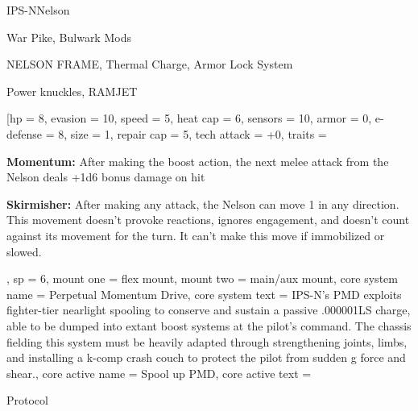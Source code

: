 
\begin{mech}{IPS-N}{Nelson}


\begin{license}
\item War Pike, Bulwark Mods
\item NELSON FRAME, Thermal Charge, Armor Lock System
\item Power knuckles, RAMJET
\end{license}

\frameBox
[hp = 8,
evasion = 10,
speed = 5,
heat cap = 6,
sensors = 10,
armor = 0,
e-defense = 8,
size = 1,
repair cap = 5,
tech attack = +0,
traits = {\textbf{Momentum:} After making the boost action, the next melee attack from the Nelson deals +1d6 bonus damage on hit

\textbf{Skirmisher:} After making any attack, the Nelson can move 1 in any direction. This movement doesn’t provoke reactions, ignores engagement, and doesn’t count against its movement for the turn. It can’t make this move if immobilized or slowed.},
sp = 6,
mount one = flex mount,
mount two = main/aux mount,
core system name = Perpetual Momentum Drive,
core system text = {IPS-N’s PMD exploits fighter-tier nearlight spooling to conserve and sustain a passive .000001LS charge, able to be dumped into extant boost systems at the pilot’s command. The chassis fielding this system must be heavily adapted through strengthening joints, limbs, and installing a k-comp crash couch to protect the pilot from sudden g force and shear.},
core active name = Spool up PMD,
core active text = {Protocol

}
\end{mech}

